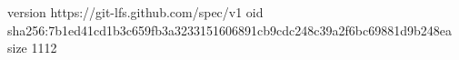 version https://git-lfs.github.com/spec/v1
oid sha256:7b1ed41cd1b3c659fb3a3233151606891cb9cdc248c39a2f6bc69881d9b248ea
size 1112
